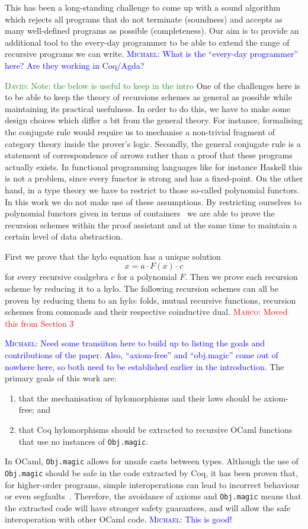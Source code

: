 \documentclass[anonymous, a4paper, UKenglish, cleveref, autoref, thm-restate]{lipics-v2021}
\newcommand{\mpav}[1]{\textcolor{red}{\textsc{Marco}: #1}}
\newcommand{\dcas}[1]{\textcolor{ForestGreen}{\textsc{David}: #1}}
\newcommand{\mvol}[1]{\textcolor{blue}{\textsc{Michael}: #1}}
\newcommand{\comp}{\cdot}
\begin{document}
This has been a long-standing challenge to come up with a sound algorithm which
rejects all programs that do not terminate (soundness) and accepts as many
well-defined programs as possible (completeness). Our aim is to provide an
additional tool to the every-day programmer to be able to extend the range of
recursive programs we can write.
\mvol{What is the ``every-day programmer'' here? Are they working in Coq/Agda?}

\dcas{Note: the below is useful to keep in the intro}
One of the challenges here is to be able to keep the theory of recursions
schemes as general as possible while maintaining its practical usefulness. In
order to do this, we have to make some design choices which differ a bit from
the general theory.  For instance, formalising the conjugate rule would require
us to mechanise a non-trivial fragment of category theory inside the prover's
logic.  Secondly, the general conjugate rule is a statement of correspondence of
arrows rather than a proof that these programs actually exists. In functional
programming languages like for instance Haskell this is not a problem, since
every functor is strong and has a fixed-point.  On the other hand, in a type
theory we have to restrict to those so-called polynomial functors. In this work
we do not make use of these assumptions. By restricting ourselves to polynomial
functors given in terms of containers~\cite{AbbottAG05} we are able to prove the
recursion schemes within the proof assistant and at the same time to maintain a
certain level of data abstraction.

First we prove that the hylo equation has a unique solution
\[
  x = a \comp F(x) \comp c
\]
for every recursive coalgebra $c$ for a polynomial $F$. Then we prove each
recursion scheme by reducing it to a hylo. The following recursion schemes can
all be proven by reducing them to an hylo: folds, mutual recursive functions,
recursion schemes from comonads and their respective coinductive dual.
\mpav{Moved this from Section 3}

\mvol{Need some transiiton here to build up to listing the goals and contributions of the paper. Also, ``axiom-free'' and ``obj.magic'' come out of nowhere here, so both need to be established earlier in the introduction.}
The primary goals of this work are:
\begin{enumerate}
  \item that the
  mechanisation of hylomorphisms and their laws should be axiom-free; and
  \item that Coq
hylomorphisms should be extracted to recursive OCaml functions that use no
instances of \texttt{Obj.magic}.
\end{enumerate}
In OCaml, \texttt{Obj.magic} allows for unsafe casts between types.
Although the use of \texttt{Obj.magic} should be safe in the code
extracted by Coq, it has been proven that, for higher-order programs, simple
interoperations can lead to incorrect behaviour or even
segfaults~\cite{forster:hal-04329663}. Therefore, the avoidance of axioms and
\texttt{Obj.magic} means that the extracted code will have stronger
safety guarantees, and will allow the safe interoperation with other OCaml code.
\mvol{This is good!}
\end{document}

